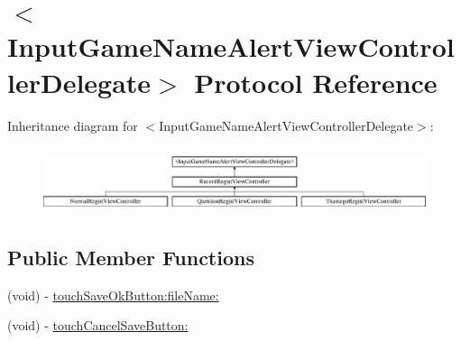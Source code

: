 \hypertarget{protocol_input_game_name_alert_view_controller_delegate-p}{
\section{$<$InputGameNameAlertViewControllerDelegate$>$ Protocol Reference}
\label{protocol_input_game_name_alert_view_controller_delegate-p}
}
Inheritance diagram for $<$InputGameNameAlertViewControllerDelegate$>$:\begin{figure}[H]
\begin{center}
\leavevmode
\includegraphics[height=1.958042cm]{protocol_input_game_name_alert_view_controller_delegate-p}
\end{center}
\end{figure}
\subsection*{Public Member Functions}
\begin{DoxyCompactItemize}
\item 
(void) -\/ \hyperlink{protocol_input_game_name_alert_view_controller_delegate-p_ad564c0dbf577affc1f34bf6e77154f44}{touchSaveOkButton:fileName:}
\item 
(void) -\/ \hyperlink{protocol_input_game_name_alert_view_controller_delegate-p_a675c33073093a55c81f4ccc3e9827f11}{touchCancelSaveButton:}
\end{DoxyCompactItemize}


